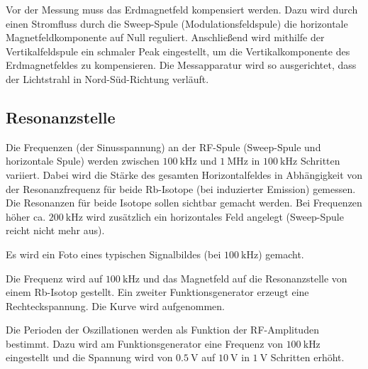 Vor der Messung muss das Erdmagnetfeld kompensiert werden.
Dazu wird durch einen Stromfluss durch die Sweep-Spule (Modulationsfeldspule) die horizontale Magnetfeldkomponente auf Null reguliert. Anschließend wird mithilfe der Vertikalfeldspule ein schmaler Peak eingestellt, um die Vertikalkomponente des Erdmagnetfeldes zu kompensieren. Die Messapparatur wird so ausgerichtet, dass der Lichtstrahl in Nord-Süd-Richtung verläuft. \cite{V21}

\subsection{Resonanzstelle}
Die Frequenzen (der Sinusspannung) an der RF-Spule (Sweep-Spule und horizontale Spule) werden zwischen $\SI{100}{\kilo\hertz}$ und $\SI{1}{\mega\hertz}$ in $\SI{100}{\kilo\hertz}$ Schritten variiert. Dabei wird die Stärke des gesamten Horizontalfeldes in Abhängigkeit von der Resonanzfrequenz für beide Rb-Isotope (bei induzierter Emission) gemessen. Die Resonanzen für beide Isotope sollen sichtbar gemacht werden. Bei Frequenzen höher  ca. $\SI{200}{\kilo\hertz}$ wird zusätzlich ein horizontales Feld angelegt (Sweep-Spule reicht nicht mehr aus).


Es wird ein Foto eines typischen Signalbildes (bei $\SI{100}{\kilo\hertz}$) gemacht. %



Die Frequenz wird auf $\SI{100}{\kilo\hertz}$ und das Magnetfeld auf die Resonanzstelle von einem Rb-Isotop gestellt. Ein zweiter Funktionsgenerator erzeugt eine Rechteckspannung. %
Die Kurve wird aufgenommen. %

Die Perioden der Oszillationen werden als Funktion der RF-Amplituden bestimmt. Dazu wird am Funktionsgenerator eine Frequenz von $\SI{100}{\kilo\hertz}$ eingestellt und die Spannung wird von $\SI{0.5}{\volt}$ auf $\SI{10}{\volt}$ in $\SI{1}{\volt}$ Schritten erhöht.
